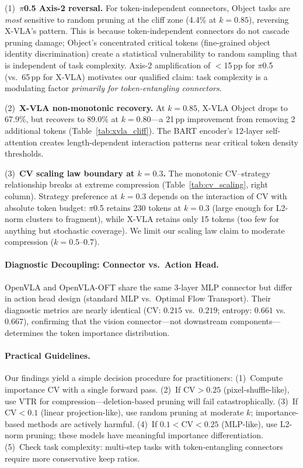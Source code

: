 \documentclass[10pt,twocolumn]{article}
\begin{document}
(1)~\textbf{$\pi$0.5 Axis-2 reversal.} For token-independent connectors, Object tasks are \emph{most} sensitive to random pruning at the cliff zone (4.4\% at $k\!=\!0.85$), reversing X-VLA's pattern.
This is because token-independent connectors do not cascade pruning damage; Object's concentrated critical tokens (fine-grained object identity discrimination) create a statistical vulnerability to random sampling that is independent of task complexity.
Axis-2 amplification of $<$15\,pp for $\pi$0.5 (vs.\ 65\,pp for X-VLA) motivates our qualified claim: task complexity is a modulating factor \emph{primarily for token-entangling connectors}.

(2)~\textbf{X-VLA non-monotonic recovery.} At $k\!=\!0.85$, X-VLA Object drops to 67.9\%, but recovers to 89.0\% at $k\!=\!0.80$---a 21\,pp improvement from removing 2 additional tokens (Table~\ref{tab:xvla_cliff}).
The BART encoder's 12-layer self-attention creates length-dependent interaction patterns near critical token density thresholds.

(3)~\textbf{CV scaling law boundary at $k\!=\!0.3$.} The monotonic CV--strategy relationship breaks at extreme compression (Table~\ref{tab:cv_scaling}, right column).
Strategy preference at $k\!=\!0.3$ depends on the interaction of CV with absolute token budget: $\pi$0.5 retains 230 tokens at $k\!=\!0.3$ (large enough for L2-norm clusters to fragment), while X-VLA retains only 15 tokens (too few for anything but stochastic coverage).
We limit our scaling law claim to moderate compression ($k\!=\!0.5$--$0.7$).

\paragraph{Diagnostic Decoupling: Connector vs.\ Action Head.}
OpenVLA and OpenVLA-OFT share the same 3-layer MLP connector but differ in action head design (standard MLP vs.\ Optimal Flow Transport).
Their diagnostic metrics are nearly identical ($\text{CV}$: $0.215$ vs.\ $0.219$; entropy: $0.661$ vs.\ $0.667$), confirming that the vision connector---not downstream components---determines the token importance distribution.

\paragraph{Practical Guidelines.}
Our findings yield a simple decision procedure for practitioners:
(1)~Compute importance CV with a single forward pass.
(2)~If $\text{CV}>0.25$ (pixel-shuffle-like), use VTR for compression---deletion-based pruning will fail catastrophically.
(3)~If $\text{CV}<0.1$ (linear projection-like), use random pruning at moderate $k$; importance-based methods are actively harmful.
(4)~If $0.1<\text{CV}<0.25$ (MLP-like), use L2-norm pruning; these models have meaningful importance differentiation.
(5)~Check task complexity: multi-step tasks with token-entangling connectors require more conservative keep ratios.
\end{document}
